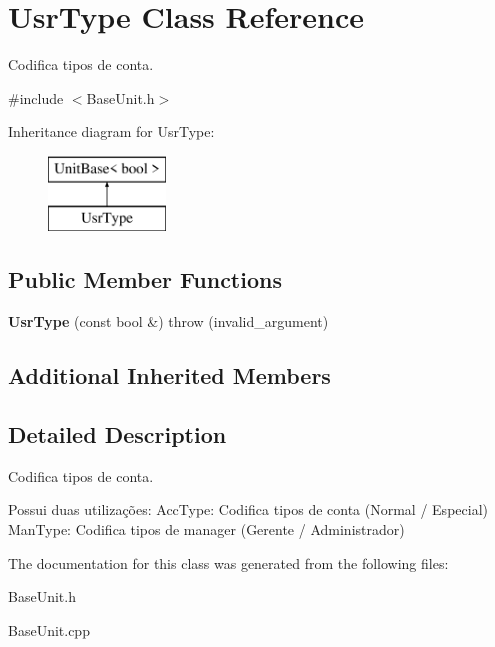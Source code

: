 \hypertarget{classUsrType}{\section{Usr\-Type Class Reference}
\label{classUsrType}
}


Codifica tipos de conta.  




{\ttfamily \#include $<$Base\-Unit.\-h$>$}

Inheritance diagram for Usr\-Type\-:\begin{figure}[H]
\begin{center}
\leavevmode
\includegraphics[height=2.000000cm]{classUsrType}
\end{center}
\end{figure}
\subsection*{Public Member Functions}
\begin{DoxyCompactItemize}
\item 
\hypertarget{classUsrType_a774f3a391ac5741802862cb7de682bb9}{{\bfseries Usr\-Type} (const bool \&)  throw (invalid\-\_\-argument)}\label{classUsrType_a774f3a391ac5741802862cb7de682bb9}

\end{DoxyCompactItemize}
\subsection*{Additional Inherited Members}


\subsection{Detailed Description}
Codifica tipos de conta. 

Possui duas utilizações\-: Acc\-Type\-: Codifica tipos de conta (Normal / Especial) Man\-Type\-: Codifica tipos de manager (Gerente / Administrador) 

The documentation for this class was generated from the following files\-:\begin{DoxyCompactItemize}
\item 
Base\-Unit.\-h\item 
Base\-Unit.\-cpp\end{DoxyCompactItemize}
